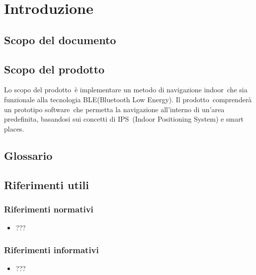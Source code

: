 \documentclass[../ClipsManualeUtente.tex]{subfiles}
\begin{document}
\section{Introduzione}
	\subsection{Scopo del documento}
	
	\subsection{Scopo del prodotto}
	Lo scopo del prodotto\g\ è implementare un metodo di navigazione indoor\g\ che sia funzionale alla tecnologia BLE\g (Bluetooth Low Energy).
	Il prodotto\g\ comprenderà un prototipo software\g\ che permetta la navigazione all'interno di un'area predefinita, basandosi sui concetti di IPS\g\ (Indoor Positioning System) e smart places\g.

	\subsection{Glossario}


	\subsection{Riferimenti utili}

		\subsubsection{Riferimenti normativi}
		\begin{itemize}
			\item ???
		\end{itemize}

		\subsubsection{Riferimenti informativi}
		\begin{itemize}
			\item ???
		\end{itemize}
			
\end{document}
